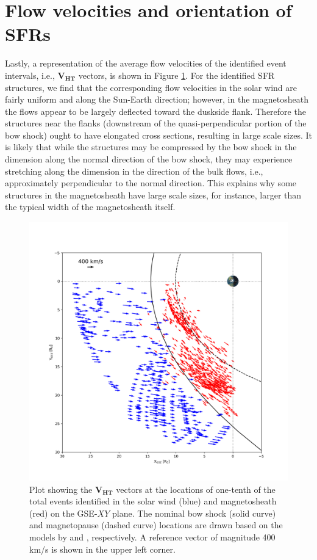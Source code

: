 \section{Flow velocities and orientation of SFRs}
Lastly, a representation of the average flow velocities of the identified event intervals, i.e., $\mathbf{V_{HT}}$ vectors, is shown in Figure \ref{fig:VHT-xy}. For the identified SFR structures, we find that the corresponding flow velocities in the solar wind are fairly uniform and along the Sun-Earth direction; however, in the magnetosheath the flows appear to be largely deflected toward the duskside flank. Therefore the structures near the flanks (downstream of the quasi-perpendicular portion of the bow shock) ought to have elongated cross sections, resulting in large scale sizes. It is likely that while the structures may be compressed by the bow shock in the dimension along the normal direction of the bow shock, they may experience stretching along the dimension in the direction of the bulk flows, i.e., approximately perpendicular to the normal direction. This explains why some structures in the magnetosheath have large scale sizes, for instance, larger than the typical width of the magnetosheath itself.

\begin{figure}
    \centering
    \includegraphics[width=\textwidth]{Figures/Orbits/VHT_xy.png}
    \caption[Orbit plot of flow vectors associated with the SFRs]{Plot showing the $\mathbf{V_{HT}}$ vectors at the locations of one-tenth of the total events identified in the solar wind (blue) and magnetosheath (red) on the GSE-$XY$ plane. The nominal bow shock (solid curve) and magnetopause (dashed curve) locations are drawn based on the models by \citet{Shue:1997} and \citet{SlavinHolzer:1984}, respectively. A reference vector of magnitude 400 km/s is shown in the upper left corner.}
    \label{fig:VHT-xy}
\end{figure}

